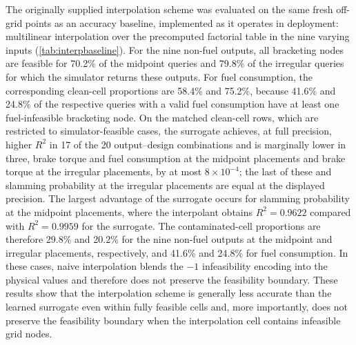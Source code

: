 \documentclass[final,5p,times,twocolumn,numbers]{elsarticle}
\begin{document}
The originally supplied interpolation scheme was evaluated on the same fresh off-grid points as an accuracy baseline, implemented as it operates in deployment: multilinear interpolation over the precomputed factorial table in the nine varying inputs (\autoref{tab:interpbaseline}). For the nine non-fuel outputs, all bracketing nodes are feasible for 70.2\% of the midpoint queries and 79.8\% of the irregular queries for which the simulator returns these outputs. For fuel consumption, the corresponding clean-cell proportions are 58.4\% and 75.2\%, because 41.6\% and 24.8\% of the respective queries with a valid fuel consumption have at least one fuel-infeasible bracketing node. On the matched clean-cell rows, which are restricted to simulator-feasible cases, the surrogate achieves, at full precision, higher $R^2$ in 17 of the 20 output--design combinations and is marginally lower in three, brake torque and fuel consumption at the midpoint placements and brake torque at the irregular placements, by at most $8\times10^{-4}$; the last of these and slamming probability at the irregular placements are equal at the displayed precision. The largest advantage of the surrogate occurs for slamming probability at the midpoint placements, where the interpolant obtains $R^2 = 0.9622$ compared with $R^2 = 0.9959$ for the surrogate. The contaminated-cell proportions are therefore 29.8\% and 20.2\% for the nine non-fuel outputs at the midpoint and irregular placements, respectively, and 41.6\% and 24.8\% for fuel consumption. In these cases, naive interpolation blends the $-1$ infeasibility encoding into the physical values and therefore does not preserve the feasibility boundary. These results show that the interpolation scheme is generally less accurate than the learned surrogate even within fully feasible cells and, more importantly, does not preserve the feasibility boundary when the interpolation cell contains infeasible grid nodes.
\end{document}
